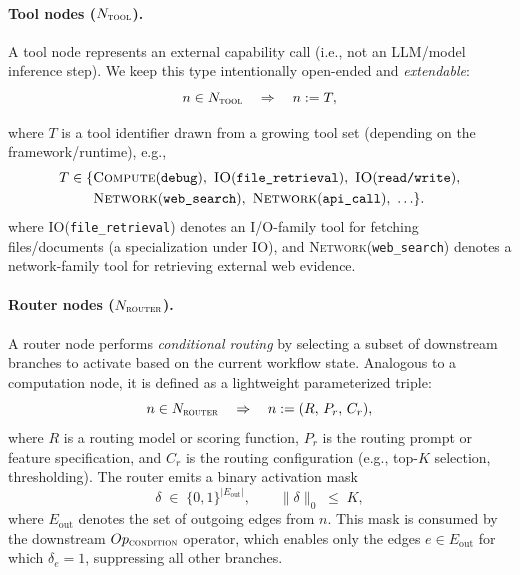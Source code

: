 \paragraph{Tool nodes ($N_{\textsc{tool}}$).}
A tool node represents an external capability call (i.e., not an LLM/model inference step). We keep this type intentionally
open-ended and \emph{extendable}:
\begin{equation}
\label{eq:ntool}
n \in N_{\textsc{tool}} \quad \Rightarrow \quad n := T,
\end{equation}


where $T$ is a tool identifier drawn from a growing tool set (depending on the framework/runtime), e.g.,
\[
\begin{aligned}
T \in \{&
\textsc{Compute}(\texttt{debug}),\ 
\textsc{IO}(\texttt{file\_retrieval}),\ 
\textsc{IO}(\texttt{read/write}),\\
&\textsc{Network}(\texttt{web\_search}),\ 
\textsc{Network}(\texttt{api\_call}),\ \ldots
\}.
\end{aligned}
\]
where \textsc{IO}(\texttt{file\_retrieval}) denotes an I/O-family tool for fetching files/documents (a specialization under \textsc{IO}),
and \textsc{Network}(\texttt{web\_search}) denotes a network-family tool for retrieving external web evidence.

\paragraph{Router nodes ($N_{\textsc{router}}$).}
A router node performs \emph{conditional routing} by selecting a subset of downstream
branches to activate based on the current workflow state.
Analogous to a computation node, it is defined as a lightweight parameterized triple:
\begin{equation}
\label{eq:nrouter}
n \in N_{\textsc{router}} \quad \Rightarrow \quad n := (R,\, P_r,\, C_r),
\end{equation}
where $R$ is a routing model or scoring function, $P_r$ is the routing prompt or feature
specification, and $C_r$ is the routing configuration (e.g., top-$K$ selection,
thresholding). The router emits a binary activation mask
\begin{equation}
\delta \;\in\; \{0,1\}^{|E_{\text{out}}|}, \qquad \|\delta\|_0 \;\le\; K,
\end{equation}
where $E_{\text{out}}$ denotes the set of outgoing edges from $n$.
This mask is consumed by the downstream $Op_{\textsc{condition}}$ operator,
which enables only the edges $e \in E_{\text{out}}$ for which $\delta_e = 1$,
suppressing all other branches.



